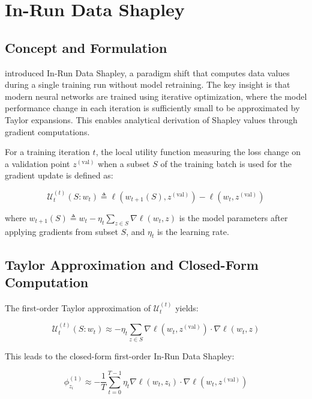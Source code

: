 \documentclass[12pt,a4paper]{report}
\begin{document}
\section{In-Run Data Shapley}
\label{sec:inrun_shapley}

\subsection{Concept and Formulation}
\label{sec:inrun_concept}

\citet{wang2025data} introduced In-Run Data Shapley, a paradigm shift that computes data values during a single training run without model retraining. The key insight is that modern neural networks are trained using iterative optimization, where the model performance change in each iteration is sufficiently small to be approximated by Taylor expansions. This enables analytical derivation of Shapley values through gradient computations.

For a training iteration $t$, the local utility function measuring the loss change on a validation point $z^{(\text{val})}$ when a subset $S$ of the training batch is used for the gradient update is defined as:

\begin{equation}
    \mathcal{U}_t^{(t)}(S : w_t) \triangleq \ell(w_{t+1}(S), z^{(\text{val})}) - \ell(w_t, z^{(\text{val})})
    \label{eq:local_utility}
\end{equation}

where $w_{t+1}(S) \triangleq w_t - \eta_t \sum_{z \in S} \nabla\ell(w_t, z)$ is the model parameters after applying gradients from subset $S$, and $\eta_t$ is the learning rate.

\subsection{Taylor Approximation and Closed-Form Computation}
\label{sec:taylor_approx}

The first-order Taylor approximation of $\mathcal{U}_t^{(t)}$ yields:

\begin{equation}
    \mathcal{U}_t^{(t)}(S : w_t) \approx -\eta_t \sum_{z \in S} \nabla\ell(w_t, z^{(\text{val})}) \cdot \nabla\ell(w_t, z)
    \label{eq:first_order_approx}
\end{equation}

This leads to the closed-form first-order In-Run Data Shapley:

\begin{equation}
    \phi_{z_i}^{(1)} \approx -\frac{1}{T} \sum_{t=0}^{T-1} \eta_t \nabla\ell(w_t, z_i) \cdot \nabla\ell(w_t, z^{(\text{val})})
    \label{eq:first_order_shapley}
\end{equation}
\end{document}
